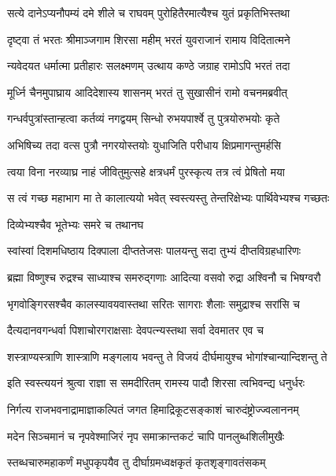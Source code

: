 \twolineshloka
{सत्ये दानेऽप्यनौपम्यं दमे शीले च राघवम्}
{पुरोहितैरमात्यैश्च युतं प्रकृतिभिस्तथा}%

\twolineshloka
{दृष्ट्वा तं भरतः श्रीमाञ्जगाम शिरसा महीम्}
{भरतं युवराजानं रामाय विदितात्मने}%

\twolineshloka
{न्यवेदयत धर्मात्मा प्रतीहारः सलक्ष्मणम्}
{उत्थाय कण्ठे जग्राह रामोऽपि भरतं तदा}%

\twolineshloka
{मूर्ध्नि चैनमुपाघ्राय आदिदेशास्य शासनम्}
{भरतं तु सुखासीनं रामो वचनमब्रवीत्}%

\twolineshloka
{गन्धर्वपुत्रांस्तान्हत्वा कर्तव्यं नगद्वयम्}
{सिन्धो रुभयपार्श्वे तु पुत्रयोरुभयोः कृते} %

\twolineshloka
{अभिषिच्य तदा वत्स पुत्रौ नगरयोस्तयोः}
{युधाजिति परीधाय क्षिप्रमागन्तुमर्हसि}%

\twolineshloka
{त्वया विना नरव्याघ्र नाहं जीवितुमुत्सहे}
{क्षत्रधर्मं पुरस्कृत्य तत्र त्वं प्रेषितो मया}%

\twolineshloka
{स त्वं गच्छ महाभाग मा ते कालात्ययो भवेत्}
{स्वस्त्यस्तु तेन्तरिक्षेभ्यः पार्थिवेभ्यश्च गच्छतः}%

\onelineshloka
{दिव्येभ्यश्चैव भूतेभ्यः समरे च तथानघ}%

\twolineshloka
{स्वांस्वां दिशमधिष्ठाय दिक्पाला दीप्ततेजसः}
{पालयन्तु सदा तुभ्यं दीप्तविग्रहधारिणः}%

\twolineshloka
{ब्रह्मा विष्णुश्च रुद्रश्च साध्याश्च समरुद्गणाः}
{आदित्या वसवो रुद्रा अश्विनौ च भिषग्वरौ}%

\twolineshloka
{भृगवोङ्गिरसश्चैव कालस्यावयवास्तथा}
{सरितः सागराः शैलाः समुद्राश्च सरांसि च}%

\twolineshloka
{दैत्यदानवगन्धर्वा पिशाचोरगराक्षसाः}
{देवपत्न्यस्तथा सर्वा देवमातर एव च}%

\twolineshloka
{शस्त्राण्यस्त्राणि शास्त्राणि मङ्गलाय भवन्तु ते}
{विजयं दीर्घमायुश्च भोगांश्चान्यान्दिशन्तु ते}%

\twolineshloka
{इति स्वस्त्ययनं श्रुत्वा राज्ञा स समदीरितम्}
{रामस्य पादौ शिरसा त्वभिवन्द्य धनुर्धरः} %

\twolineshloka
{निर्गत्य राजभवनाद्रामाज्ञाकल्पितं जगत}
{हिमाद्रिकूटसङ्काशं चारुदंष्ट्रोज्ज्वलाननम्}%

\twolineshloka
{मदेन सिञ्चमानं च नृपवेश्माजिरं नृप}
{समाक्रान्तकटं चापि पानलुब्धशिलीमुखैः}%

\twolineshloka
{स्तब्धचारुमहाकर्णं मधुपकृपयैव तु}
{दीर्घाग्रमध्वक्षकृतं कृतशृङ्गावतंसकम्}%

